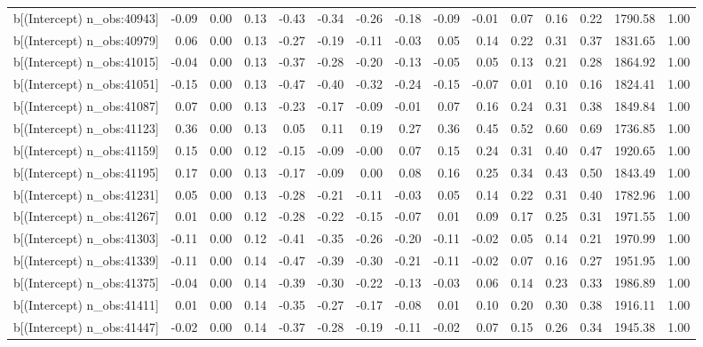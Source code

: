 \begin{table}[ht]
\begin{tabular}{rrrrrrrrrrrrrrr}
  b[(Intercept) n\_obs:40943] & -0.09 & 0.00 & 0.13 & -0.43 & -0.34 & -0.26 & -0.18 & -0.09 & -0.01 & 0.07 & 0.16 & 0.22 & 1790.58 & 1.00 \\ 
  b[(Intercept) n\_obs:40979] & 0.06 & 0.00 & 0.13 & -0.27 & -0.19 & -0.11 & -0.03 & 0.05 & 0.14 & 0.22 & 0.31 & 0.37 & 1831.65 & 1.00 \\ 
  b[(Intercept) n\_obs:41015] & -0.04 & 0.00 & 0.13 & -0.37 & -0.28 & -0.20 & -0.13 & -0.05 & 0.05 & 0.13 & 0.21 & 0.28 & 1864.92 & 1.00 \\ 
  b[(Intercept) n\_obs:41051] & -0.15 & 0.00 & 0.13 & -0.47 & -0.40 & -0.32 & -0.24 & -0.15 & -0.07 & 0.01 & 0.10 & 0.16 & 1824.41 & 1.00 \\ 
  b[(Intercept) n\_obs:41087] & 0.07 & 0.00 & 0.13 & -0.23 & -0.17 & -0.09 & -0.01 & 0.07 & 0.16 & 0.24 & 0.31 & 0.38 & 1849.84 & 1.00 \\ 
  b[(Intercept) n\_obs:41123] & 0.36 & 0.00 & 0.13 & 0.05 & 0.11 & 0.19 & 0.27 & 0.36 & 0.45 & 0.52 & 0.60 & 0.69 & 1736.85 & 1.00 \\ 
  b[(Intercept) n\_obs:41159] & 0.15 & 0.00 & 0.12 & -0.15 & -0.09 & -0.00 & 0.07 & 0.15 & 0.24 & 0.31 & 0.40 & 0.47 & 1920.65 & 1.00 \\ 
  b[(Intercept) n\_obs:41195] & 0.17 & 0.00 & 0.13 & -0.17 & -0.09 & 0.00 & 0.08 & 0.16 & 0.25 & 0.34 & 0.43 & 0.50 & 1843.49 & 1.00 \\ 
  b[(Intercept) n\_obs:41231] & 0.05 & 0.00 & 0.13 & -0.28 & -0.21 & -0.11 & -0.03 & 0.05 & 0.14 & 0.22 & 0.31 & 0.40 & 1782.96 & 1.00 \\ 
  b[(Intercept) n\_obs:41267] & 0.01 & 0.00 & 0.12 & -0.28 & -0.22 & -0.15 & -0.07 & 0.01 & 0.09 & 0.17 & 0.25 & 0.31 & 1971.55 & 1.00 \\ 
  b[(Intercept) n\_obs:41303] & -0.11 & 0.00 & 0.12 & -0.41 & -0.35 & -0.26 & -0.20 & -0.11 & -0.02 & 0.05 & 0.14 & 0.21 & 1970.99 & 1.00 \\ 
  b[(Intercept) n\_obs:41339] & -0.11 & 0.00 & 0.14 & -0.47 & -0.39 & -0.30 & -0.21 & -0.11 & -0.02 & 0.07 & 0.16 & 0.27 & 1951.95 & 1.00 \\ 
  b[(Intercept) n\_obs:41375] & -0.04 & 0.00 & 0.14 & -0.39 & -0.30 & -0.22 & -0.13 & -0.03 & 0.06 & 0.14 & 0.23 & 0.33 & 1986.89 & 1.00 \\ 
  b[(Intercept) n\_obs:41411] & 0.01 & 0.00 & 0.14 & -0.35 & -0.27 & -0.17 & -0.08 & 0.01 & 0.10 & 0.20 & 0.30 & 0.38 & 1916.11 & 1.00 \\ 
  b[(Intercept) n\_obs:41447] & -0.02 & 0.00 & 0.14 & -0.37 & -0.28 & -0.19 & -0.11 & -0.02 & 0.07 & 0.15 & 0.26 & 0.34 & 1945.38 & 1.00 \\ 

\end{tabular}
\end{table}
